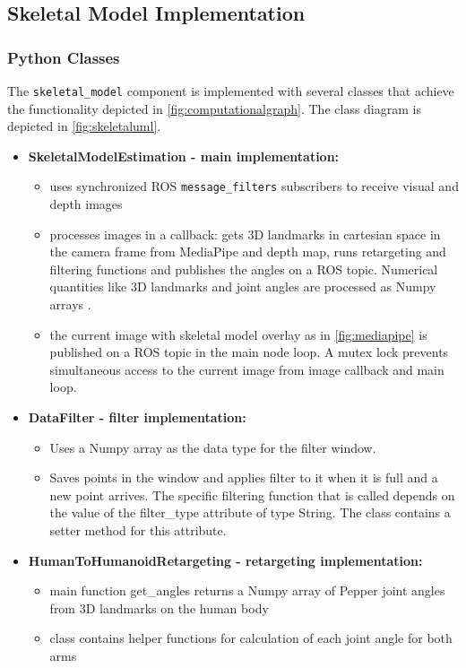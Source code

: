 \documentclass{CSSRforAfrica}
\begin{document}
\newpage



\vspace*{0.5em}
\subsection{Skeletal Model Implementation}

\subsubsection*{Python Classes}
The \texttt{skeletal\_model} component is implemented with several classes that achieve the functionality depicted in \cref{fig:computationalgraph}. The class diagram is depicted in \cref{fig:skeletaluml}.

\begin{itemize}
    \item \textbf{SkeletalModelEstimation - main implementation:} 
    \begin{itemize}
        \item uses synchronized ROS \texttt{message\_filters} subscribers to receive visual and depth images
        \item processes images in a callback: gets 3D landmarks in cartesian space in the camera frame from MediaPipe and depth map, runs retargeting and filtering functions and publishes the angles on a ROS topic. Numerical quantities like 3D landmarks and joint angles are processed as Numpy arrays \cite{harris2020array}. 
        \item the current image with skeletal model overlay as in \cref{fig:mediapipe} is published on a ROS topic in the main node loop. A mutex lock prevents simultaneous access to the current image from image callback and main loop. 
    \end{itemize}
    \item \textbf{DataFilter - filter implementation:}
    \begin{itemize}
        \item Uses a Numpy array as the data type for the filter window. 
        \item Saves points in the window and applies filter to it when it is full and a new point arrives. The specific filtering function that is called depends on the value of the filter\_type attribute  of type String. The class contains a setter method for this attribute. 
    \end{itemize}
    \item \textbf{HumanToHumanoidRetargeting - retargeting implementation:}
    \begin{itemize}
        \item main function get\_angles returns a Numpy array of Pepper joint angles from 3D landmarks on the human body
        \item class contains helper functions for calculation of each joint angle for both arms
    \end{itemize}
\end{itemize}
\end{document}
